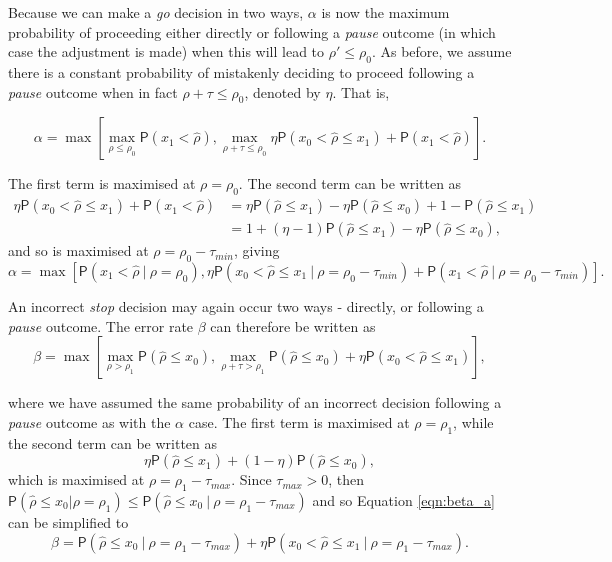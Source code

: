 \documentclass{bmcart}
\newcommand{\PR}{{\mathsf P}}
\begin{document}
Because we can make a \emph{go} decision in two ways, $\alpha$ is now the maximum probability of proceeding either directly or following a \emph{pause} outcome (in which case the adjustment is made) when this will lead to $\rho' \leq \rho_0$. As before, we assume there is a constant probability of mistakenly deciding to proceed following a \emph{pause} outcome when in fact $\rho + \tau \leq \rho_0$, denoted  by $\eta$. That is,

$$
\alpha = \max \left[ \max_{\rho \leq \rho_0} \PR(x_1 < \hat{\rho}), \max_{\rho + \tau \leq \rho_0} \eta \PR(x_0 < \hat{\rho} \leq x_1) + \PR(x_1 < \hat{\rho}) \right].
$$

The first term is maximised at $\rho = \rho_0$. The second term can be written as
$$
\begin{aligned}
\eta \PR(x_0 < \hat{\rho} \leq x_1) + \PR(x_1 < \hat{\rho}) &=
\eta \PR(\hat{\rho} \leq x_1) - \eta \PR(\hat{\rho} \leq x_0) + 1 - \PR(\hat{\rho} \leq x_1)\\
&= 1 + (\eta - 1)\PR(\hat{\rho} \leq x_1) - \eta \PR(\hat{\rho} \leq x_0),
\end{aligned}
$$
and so is maximised at $\rho = \rho_0 - \tau_{min}$, giving 
\begin{equation}\label{eqn:alpha}
\alpha = \max \left[ \PR(x_1 < \hat{\rho} ~|~ \rho = \rho_0), \eta \PR(x_0 < \hat{\rho} \leq x_1 ~|~ \rho = \rho_0 - \tau_{min}) + \PR(x_1 < \hat{\rho} ~|~ \rho = \rho_0 - \tau_{min}) \right].
\end{equation}

An incorrect \emph{stop} decision may again occur two ways - directly, or following a \emph{pause} outcome. The error rate $\beta$ can therefore be written as
\begin{equation}\label{eqn:beta_a}
\beta = \max \left[ \max_{\rho > \rho_1} \PR(\hat{\rho} \leq x_0), \max_{\rho + \tau > \rho_1} \PR(\hat{\rho} \leq x_0) + \eta \PR(x_0 < \hat{\rho} \leq x_1) \right],
\end{equation}

where we have assumed the same probability of an incorrect decision following a \emph{pause} outcome as with the $\alpha$ case. The first term is maximised at $\rho = \rho_1$, while the second term can be written as
$$
\eta \PR(\hat{\rho} \leq x_1) + (1 - \eta) \PR(\hat{\rho} \leq x_0),
$$
which is maximised at $\rho = \rho_1 - \tau_{max}$. Since $\tau_{max} > 0$, then $\PR(\hat{\rho} \leq x_0 | \rho = \rho_1) \leq \PR(\hat{\rho} \leq x_0 ~|~ \rho = \rho_1  - \tau_{max})$ and so Equation \ref{eqn:beta_a} can be simplified to
\begin{equation}\label{eqn:beta}
\beta = \PR(\hat{\rho} \leq x_0 ~|~ \rho = \rho_1 - \tau_{max}) + \eta \PR(x_0 < \hat{\rho} \leq x_1 ~|~ \rho = \rho_1 - \tau_{max}).
\end{equation}
\end{document}
